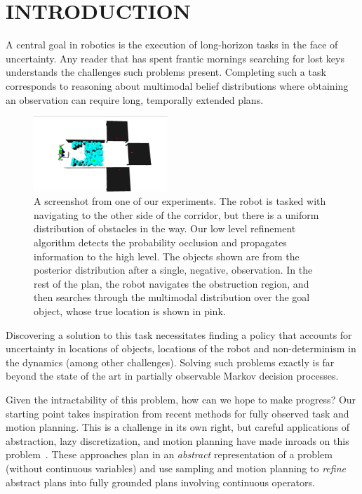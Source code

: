\section{INTRODUCTION}
A central goal in robotics is the execution of long-horizon tasks in
the face of uncertainty. Any reader that has spent frantic mornings
searching for lost keys understands the challenges such problems
present. Completing such a task corresponds to reasoning about
multimodal belief distributions where obtaining an observation
can require long, temporally extended plans. 
\begin{figure}[h]
  \centering
    \noindent
    \includegraphics[width=0.45\textwidth]{corridor_images/obj_at_true_loc.png}
  \caption{A screenshot from one of our experiments. The robot is
    tasked with navigating to the other side of the corridor, but
    there is a uniform distribution of obstacles in the way. Our low
    level refinement algorithm detects the probability occlusion and
    propagates information to the high level. The objects shown are
    from the posterior distribution after a single, negative,
    observation. In the rest of the plan, the robot navigates the
    obstruction region, and then searches through the multimodal
    distribution over the goal object, whose true location is shown in pink.}
  \label{fig:knot_steps}
\end{figure}


Discovering a solution to this task necessitates finding a policy that
accounts for uncertainty in locations of objects, locations of the
robot and non-determinism in the dynamics (among other
challenges). Solving such problems exactly is far beyond the state of
the art in partially observable Markov decision processes.

Given the intractability of this problem, how can we hope to make
progress? Our starting point takes inspiration from recent methods for
fully observed task and motion planning.  This is a challenge in its
own right, but careful applications of abstraction, lazy
discretization, and motion planning have made inroads on this
problem~\cite{srivastava2014combined, lozano2014constraint}. These
approaches plan in an \emph{abstract} representation of a problem
(without continuous variables) and use sampling and motion planning to
\emph{refine} abstract plans into fully grounded plans involving continuous
operators.

